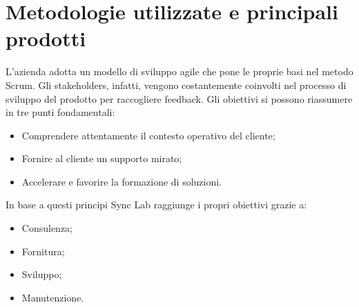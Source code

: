 \section{Metodologie utilizzate e principali prodotti}
L’azienda adotta un modello di sviluppo agile che pone le proprie basi nel metodo Scrum. Gli stakeholders, infatti, vengono costantemente coinvolti nel processo di
sviluppo del prodotto per raccogliere feedback. Gli obiettivi si possono riassumere in tre punti fondamentali:
\begin{itemize}
	\item Comprendere attentamente il contesto operativo del cliente; 
	\item Fornire al cliente un supporto mirato; 
	\item Accelerare e favorire la formazione di soluzioni. 
\end{itemize}
In base a questi principi Sync Lab raggiunge i propri obiettivi grazie a:
\begin{itemize}
	\item Consulenza; 
	\item Fornitura; 
	\item Sviluppo; 
	\item Manutenzione. \\
\end{itemize}


